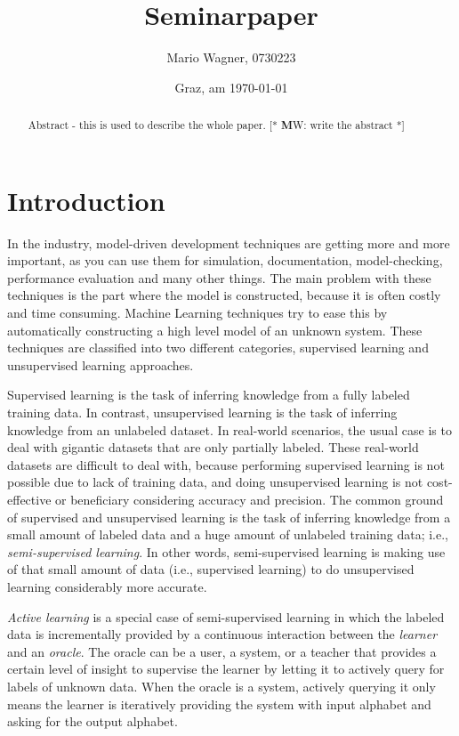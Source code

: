 \documentclass[
a4paper,
12pt
]{scrartcl}
\title{Seminarpaper}
\author{Mario Wagner, 0730223}
\date{Graz, am \today{}}
\newcommand\mw[1]{ [* {\textbf MW:} #1 *]}
\begin{document}
 \maketitle
 \tableofcontents
 \listoffigures
 \listoftables

\newpage



\begin{abstract}
  Abstract - this is used to describe the whole paper.
  \mw{write the abstract}
\end{abstract}


\section{Introduction}
In the industry, model-driven development techniques are getting more and more important, as you can use them for simulation, documentation, model-checking, performance evaluation and many other things. The main problem with these techniques is the part where the model is constructed, because it is often costly and time consuming. Machine Learning techniques try to ease this by automatically constructing a high level model of an unknown system. These techniques are classified into two different categories, supervised learning and unsupervised learning approaches.

\par Supervised learning is the task of inferring knowledge from a fully labeled training data. In contrast, unsupervised learning is the task of inferring knowledge from an unlabeled dataset. In real-world scenarios, the usual case is to deal with gigantic datasets that are only partially labeled. These real-world datasets are difficult to deal with, because performing supervised learning is not possible due to lack of training data, and doing unsupervised learning is not cost-effective or beneficiary considering accuracy and precision. The common ground of supervised and unsupervised learning is the task of inferring knowledge from a small amount of labeled data and a huge amount of unlabeled training data; i.e., \emph{semi-supervised learning}. In other words, semi-supervised learning is making use of that small amount of data (i.e., supervised learning) to do unsupervised learning considerably more accurate.

\par \emph{Active learning} is a special case of semi-supervised learning in which the labeled data is incrementally provided by a continuous interaction between the \emph{learner} and an \emph{oracle}. The oracle can be a user, a system, or a teacher that provides a certain level of insight to supervise the learner by letting it to actively query for labels of unknown data. When the oracle is a system, actively querying it only means the learner is iteratively providing the system with input alphabet and asking for the output alphabet.
\end{document}

